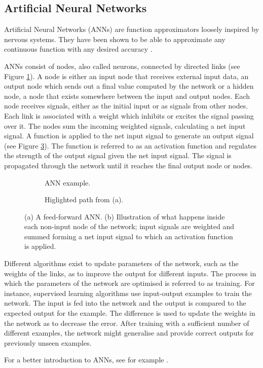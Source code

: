 \newpage
\subsection{Artificial Neural Networks}
Artificial Neural Networks (ANNs) are function approximators loosely inspired by nervous systems. They have been shown to be able
to approximate any continuous function with any desired accuracy \cite{universality_formal,universality_informal}.

ANNs consist of nodes, also called neurons, connected by directed links (see Figure \ref{feedforward}).
A node is either an input node that receives external input data, an output node which sends out a final value computed
by the network or a hidden node, a node that exists somewhere between the input and output nodes. Each node receives signals, either
as the initial input or as signals from other nodes. Each link is associated with a weight which inhibits or excites the signal
passing over it. The nodes sum the incoming weighted signals, calculating a net input signal. A function is applied to the net input
signal to generate an output signal (see Figure \ref{neuron}). The function is referred to as an activation function and regulates the strength of the output
signal given the net input signal. The signal is propagated through the network until it reaches the final output node or nodes.


\begin{figure}[htb]
    \begin{mdframed}
        \begin{subfigure}[b]{0.5\textwidth}
            \centering
            \resizebox{0.7\textwidth}{!}{}
            \caption{ANN example.}
            \label{feedforward}
        \end{subfigure}
        \begin{subfigure}[b]{0.5\textwidth}
            \centering
            \resizebox{0.9\textwidth}{!}{}
            \caption{Higlighted path from (a).}
            \label{neuron}
        \end{subfigure}
    \end{mdframed}
    \caption{(a) A feed-forward ANN. (b) Illustration of what happens inside each non-input node of the network; input
                 signals are weighted and summed forming a net input signal to which an activation function is applied.}
\end{figure}

Different algorithms exist to update parameters of the network, such as the weights of the
links, as to improve the output for different inputs. The process in which the parameters of
the network are optimised is referred to as training. For instance, supervised learning algorithms use input-output
examples to train the network. The input is fed into the network and the output is compared
to the expected output for the example. The difference is used to update the weights in the network as to decrease
the error. After training with a sufficient number of different examples, the network might generalise and provide
correct outputs for previously unseen examples.

For a better introduction to ANNs, see for example \cite{compint}.